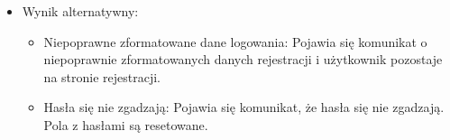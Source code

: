 \begin{itemize}
\begin{itemize}
\begin{itemize}
      \item Poprawnie zformatowane dane logowania: Zostaje stworzone nowe konto oraz gość zostanie przeniesiony na sesję użytkownika.
    \end{itemize}
    \item Wynik alternatywny:
    \begin{itemize}
      \item Niepoprawne zformatowane dane logowania: Pojawia się komunikat o niepoprawnie zformatowanych danych rejestracji i użytkownik pozostaje na stronie rejestracji.
      \item Hasła się nie zgadzają: Pojawia się komunikat, że hasła się nie zgadzają. Pola z hasłami są resetowane.
    \end{itemize}
  \end{itemize}
\end{itemize}
